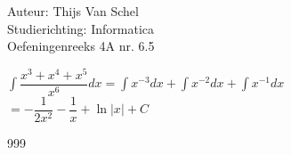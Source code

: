 \documentclass[a4paper]{article}
\newcommand{\dint}{\displaystyle\int}
\begin{document}
  
\noindent \large Auteur: Thijs Van Schel \\
\noindent \large Studierichting: Informatica\\
\noindent \large Oefeningenreeks 4A nr. 6.5\\

\medskip

\normalsize

$\dint{\dfrac{x^3+x^4+x^5}{x^6}dx} = \dint x^{-3}dx+\dint x^{-2}dx + \dint x^{-1}dx$\\

$= -\dfrac{1}{2x^2}-\dfrac{1}{x}+ \ln|x| + C$

\begin{thebibliography}{999}
\end{thebibliography}
\end{document}
